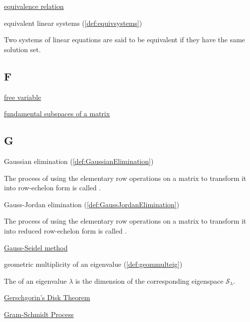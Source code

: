 \documentclass{ximera}
\begin{document}
\href{https://ximera.osu.edu/oerlinalg/LinearAlgebra/EIG-0040/main}{equivalence relation}

equivalent linear systems (\ref{def:equivsystems})
\begin{expandable}
    Two systems of linear equations are said to be equivalent if they have the same solution set.
\end{expandable}



\subsection{F}

\href{https://ximera.osu.edu/oerlinalg/LinearAlgebra/SYS-0020/main}{free variable}

\href{https://ximera.osu.edu/oerlinalg/LinearAlgebra/VSP-0040/main}{fundamental subspaces of a matrix}


\subsection{G}

Gaussian elimination (\ref{def:GaussianElimination})
\begin{expandable}
    The process of using the elementary row operations on a matrix to transform it into row-echelon form is called .
\end{expandable}

Gauss-Jordan elimination (\ref{def:GaussJordanElimination})
\begin{expandable}
    The process of using the elementary row operations on a matrix to transform it into reduced row-echelon form is called .
\end{expandable}

\href{https://ximera.osu.edu/oerlinalg/LinearAlgebra/SYS-0040/main}{Gauss-Seidel method}

geometric multiplicity of an eigenvalue (\ref{def:geommulteig})
\begin{expandable}
    The  of an eigenvalue $\lambda$ is the dimension of the corresponding eigenspace $\mathcal{S}_\lambda$.
\end{expandable}

\href{https://ximera.osu.edu/oerlinalg/LinearAlgebra/EIG-0080/main}{Gerschgorin's Disk Theorem}

\href{https://ximera.osu.edu/oerlinalg/LinearAlgebra/RTH-0015/main}{Gram-Schmidt Process}
\end{document}
